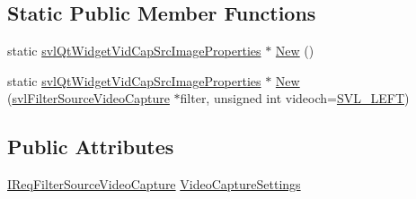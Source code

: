 \subsection*{Static Public Member Functions}
\begin{DoxyCompactItemize}
\item 
static \hyperlink{classsvl_qt_widget_vid_cap_src_image_properties}{svl\+Qt\+Widget\+Vid\+Cap\+Src\+Image\+Properties} $\ast$ \hyperlink{classsvl_qt_widget_vid_cap_src_image_properties_af30f99af8fd9c68aaf22f30bee11e0dc}{New} ()
\item 
static \hyperlink{classsvl_qt_widget_vid_cap_src_image_properties}{svl\+Qt\+Widget\+Vid\+Cap\+Src\+Image\+Properties} $\ast$ \hyperlink{classsvl_qt_widget_vid_cap_src_image_properties_aded9d5e95e0cfbadbe02637bad07942c}{New} (\hyperlink{classsvl_filter_source_video_capture}{svl\+Filter\+Source\+Video\+Capture} $\ast$filter, unsigned int videoch=\hyperlink{svl_definitions_8h_ab9fec7615f19c8df2919eebcab0b187f}{S\+V\+L\+\_\+\+L\+E\+F\+T})
\end{DoxyCompactItemize}
\subsection*{Public Attributes}
\begin{DoxyCompactItemize}
\item 
\hyperlink{class_i_req_filter_source_video_capture}{I\+Req\+Filter\+Source\+Video\+Capture} \hyperlink{classsvl_qt_widget_vid_cap_src_image_properties_afbb8469c066f6acc9cc475f32cca47e6}{Video\+Capture\+Settings}
\end{DoxyCompactItemize}
